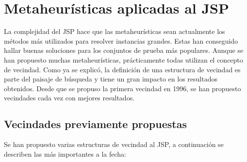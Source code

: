 \section{Metaheurísticas aplicadas al JSP}
La complejidad del JSP hace que las metaheurísticas sean actualmente los métodos más utilizados para resolver instancias grandes. Estas han conseguido hallar buenas soluciones para los conjuntos de prueba más populares. Aunque se han propuesto muchas metaheurísticas, prácticamente todas utilizan el concepto de vecindad. Como ya se explicó, la definición de una estructura de vecindad es parte del paisaje de búsqueda y tiene un gran impacto en los resultados obtenidos. Desde que se propuso la primera vecindad en 1996, se han propuesto vecindades cada vez con mejores resultados.

\subsection*{Vecindades previamente propuestas}
Se han propuesto varias estructuras de vecindad al JSP, a continuación se describen las más importantes a la fecha:


